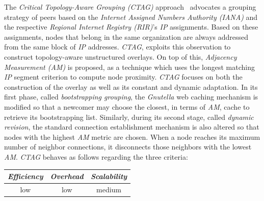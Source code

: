 The \emph{Critical Topology-Aware Grouping (CTAG)} approach~\cite{ZL2006}
advocates a grouping strategy of peers based on the 
\emph{Internet Assigned Numbers Authority (IANA)} and 
the respective \emph{Regional Internet Registry (RIR)}'s \emph{IP} assignments.
Based on these assignments, nodes that belong in the same 
organization are always addressed from the same block of \emph{IP} addresses.
\emph{CTAG}, exploits this observation to construct topology-aware unstructured
overlays. On top of this, \emph{Adjacency Measurement (AM)} is proposed, as
a technique which uses the longest matching \emph{IP} segment criterion to
compute node proximity. \emph{CTAG} focuses on both the construction of the
overlay as well as its constant and dynamic adaptation.
In its first phase, called \emph{bootstrapping grouping},
the {\sl Gnutella} web caching mechanism
is modified so that a newcomer may choose the closest, in terms of \emph{AM},
cache to retrieve its bootstrapping list. 
Similarly, during its second stage,
called \emph{dynamic revision}, the standard connection establishment mechanism
is also altered so that nodes with the highest \emph{AM} metric are chosen. 
When a node reaches its maximum number of neighbor
connections, it disconnects those neighbors with the lowest \emph{AM}.
\emph{CTAG} behaves as follows regarding the three criteria:
\begin{center}
{\footnotesize
\begin{tabular}{ccc}
\emph{Efficiency} & \emph{Overhead} & \emph{Scalability} \\
\hline
low &
low &
medium
\end{tabular}
}
\end{center}



